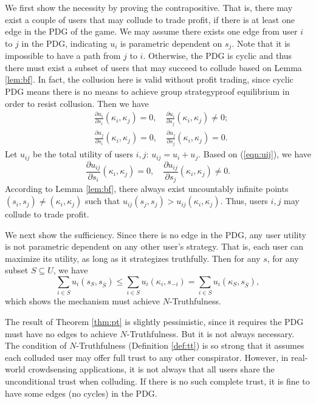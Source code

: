 \documentclass[conference]{IEEEtran}
\theoremstyle{definition}
\begin{document}
\begin{IEEEproof}
We first show the necessity by proving the contrapositive. That is, there may exist a couple of users that may collude to trade profit, if there is at least one edge in the PDG of the game. We may assume there exists one edge from user $i$ to $j$ in the PDG, indicating $u_i$ is parametric dependent on $s_j$. Note that it is impossible to have a path from $j$ to $i$. Otherwise, the PDG is cyclic and thus there must exist a subset of users that may succeed to collude based on Lemma \ref{lem:bf}. In fact, the collusion here is valid without profit trading, since cyclic PDG means there is no means to achieve group strategyproof equilibrium in order to resist collusion. Then we have
\begin{equation}
\label{eqn:uij}
\begin{aligned}
&\frac{\partial u_i}{\partial s_i}(\kappa_i,\kappa_j)=0, \quad \frac{\partial u_i}{\partial s_j}(\kappa_i,\kappa_j)\not=0;\\
&\frac{\partial u_j}{\partial s_i}(\kappa_i,\kappa_j)=0, \quad \frac{\partial u_j}{\partial s_j}(\kappa_i,\kappa_j)=0.
\end{aligned}
\end{equation}
Let $u_{ij}$ be the total utility of users $i,j$: $u_{ij}=u_i+u_j$. Based on (\ref{eqn:uij}), we have
\begin{equation}
\frac{\partial u_{ij}}{\partial s_i}(\kappa_i,\kappa_j)=0, \quad \frac{\partial u_{ij}}{\partial s_j}(\kappa_i,\kappa_j)\not=0.
\end{equation}
According to Lemma \ref{lem:bf}, there always exist uncountably infinite points $(s_i,s_j)\not=(\kappa_i,\kappa_j)$ such that $u_{ij}(s_j,s_j)>u_{ij}(\kappa_i,\kappa_j)$. Thus, users $i,j$ may collude to trade profit.

We next show the sufficiency. Since there is no edge in the PDG, any user utility is not parametric dependent on any other user\rq{}s strategy. That is, each user can maximize its utility, as long as it strategizes truthfully. Then for any $s$, for any subset $S\subseteq U$, we have
\begin{equation}
\sum_{i\in S}u_i(s_S,s_{\overline{S}})\leq \sum_{i\in S}u_i(\kappa_i,s_{-i}) = \sum_{i\in S}u_i(\kappa_S,s_{\overline{S}}),
\end{equation}
which shows the mechanism must achieve $N$-Truthfulness.
\end{IEEEproof}
{\color{black}
The result of Theorem \ref{thm:pt} is slightly pessimistic, since it requires the PDG must have no edges to achieve $N$-Truthfulness. But it is not always necessary. The condition of $N$-Truthfulness (Definition \ref{def:tt}) is so strong that it assumes each colluded user may offer full trust to any other conspirator. However, in real-world crowdsensing applications, it is not always that all users share the unconditional trust when colluding. If there is no such complete trust, it is fine to have some edges (no cycles) in the PDG.
}
\end{document}

